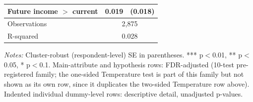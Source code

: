 \begin{table}[H]
\begin{tabular}{ l c c }
\hspace{0.05cm} Future income $>$ current & 0.019 & (0.018) \\
\hline
\hspace{0.05cm} Observations & \multicolumn{2}{c}{2,875} \\
\hspace{0.05cm} R-squared & \multicolumn{2}{c}{0.028} \\
\hline \hline
\end{tabular}
\begin{tablenotes}
\small
\item \textit{Notes:} Cluster-robust (respondent-level) SE in parentheses. *** p$<$0.01, ** p$<$0.05, * p$<$0.1. Main-attribute and hypothesis rows: FDR-adjusted (10-test pre-registered family; the one-sided Temperature test is part of this family but not shown as its own row, since it duplicates the two-sided Temperature row above). Indented individual dummy-level rows: descriptive detail, unadjusted p-values.
\end{tablenotes}
    \label{tab:results_h1h4}
\end{table}
